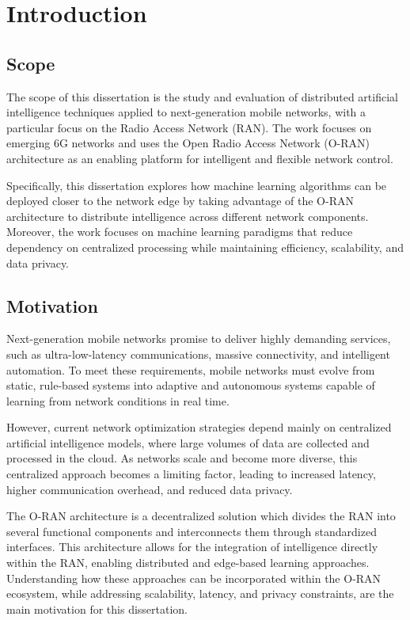 \chapter{Introduction}%
\label{chapter:introduction}



\section{Scope}
The scope of this dissertation is the study and evaluation of distributed artificial intelligence techniques applied to next-generation mobile networks, with a particular focus on the Radio Access Network (RAN). The work focuses on emerging 6G networks and uses the Open Radio Access Network (O-RAN) architecture as an enabling platform for intelligent and flexible network control.

Specifically, this dissertation explores how machine learning algorithms can be deployed closer to the network edge by taking advantage of the O-RAN architecture to distribute intelligence across different network components. Moreover, the work focuses on machine learning paradigms that reduce dependency on centralized processing while maintaining efficiency, scalability, and data privacy.

\section{Motivation}

Next-generation mobile networks promise to deliver highly demanding services, such as ultra-low-latency communications, massive connectivity, and intelligent automation. To meet these requirements, mobile networks must evolve from static, rule-based systems into adaptive and autonomous systems capable of learning from network conditions in real time.

However, current network optimization strategies depend mainly on centralized artificial intelligence models, where large volumes of data are collected and processed in the cloud. As networks scale and become more diverse, this centralized approach becomes a limiting factor, leading to increased latency, higher communication overhead, and reduced data privacy.

The O-RAN architecture is a decentralized solution which divides the RAN into several functional components and interconnects them through standardized interfaces. This architecture allows for the integration of intelligence directly within the RAN, enabling distributed and edge-based learning approaches. Understanding how these approaches can be incorporated within the O-RAN ecosystem, while addressing scalability, latency, and privacy constraints, are the main motivation for this dissertation.

